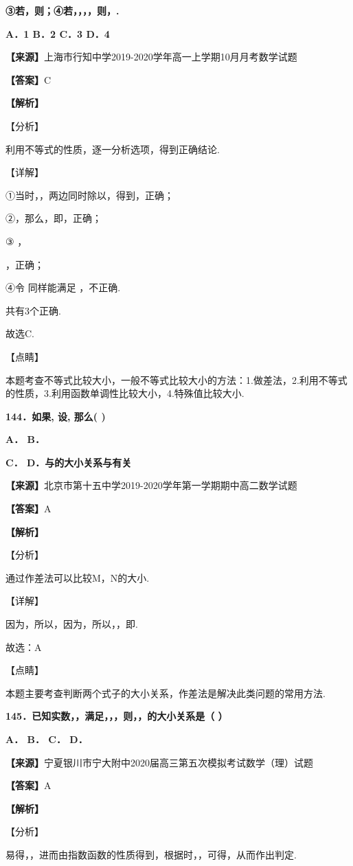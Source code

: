 \textbf{③若，则；④若，，，，则，.}

\textbf{A．1 B．2 C．3 D．4}

\textbf{【来源】}上海市行知中学2019-2020学年高一上学期10月月考数学试题

\textbf{【答案】}C

\textbf{【解析】}

【分析】

利用不等式的性质，逐一分析选项，得到正确结论.

【详解】

①当时，，两边同时除以，得到，正确；

②，那么，即，正确；

③ ，

，正确；

④令 同样能满足 ，不正确.

共有3个正确.

故选C.

【点睛】

本题考查不等式比较大小，一般不等式比较大小的方法：1.做差法，2.利用不等式的性质，3.利用函数单调性比较大小，4.特殊值比较大小.

\textbf{144．如果, 设, 那么( )}

\textbf{A． B．}

\textbf{C． D．与的大小关系与有关}

\textbf{【来源】}北京市第十五中学2019-2020学年第一学期期中高二数学试题

\textbf{【答案】}A

\textbf{【解析】}

【分析】

通过作差法可以比较M，N的大小.

【详解】

因为，所以，因为，所以，，即.

故选：A

【点睛】

本题主要考查判断两个式子的大小关系，作差法是解决此类问题的常用方法.

\textbf{145．已知实数，，满足，，，则，，的大小关系是（ ）}

\textbf{A． B． C． D．}

\textbf{【来源】}宁夏银川市宁大附中2020届高三第五次模拟考试数学（理）试题

\textbf{【答案】}A

\textbf{【解析】}

【分析】

易得，，进而由指数函数的性质得到，根据时，，可得，从而作出判定.

